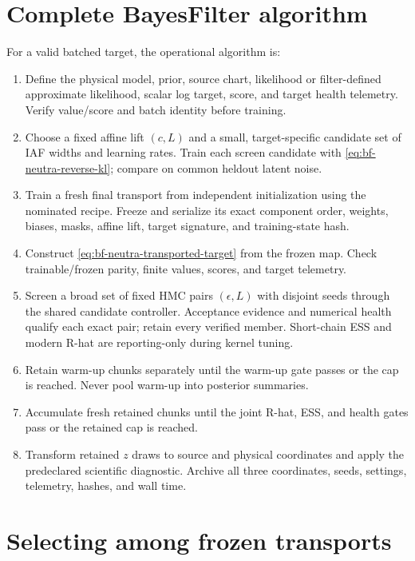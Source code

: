 \section{Complete BayesFilter algorithm}

For a valid batched target, the operational algorithm is:
\begin{enumerate}
 \item Define the physical model, prior, source chart, likelihood or
 filter-defined approximate likelihood, scalar log target, score, and target
 health telemetry.  Verify value/score and batch identity before training.
 \item Choose a fixed affine lift $(c,L)$ and a small, target-specific candidate
 set of IAF widths and learning rates.  Train each screen candidate with
 \eqref{eq:bf-neutra-reverse-kl}; compare on common heldout latent noise.
 \item Train a fresh final transport from independent initialization using the
 nominated recipe.  Freeze and serialize its exact component order, weights,
 biases, masks, affine lift, target signature, and training-state hash.
 \item Construct \eqref{eq:bf-neutra-transported-target} from the frozen map.
 Check trainable/frozen parity, finite values, scores, and target telemetry.
 \item Screen a broad set of fixed HMC pairs $(\epsilon,L)$ with disjoint
 seeds through the shared candidate controller. Acceptance evidence and
 numerical health qualify each exact pair; retain every verified member.
 Short-chain ESS and modern R-hat are reporting-only during kernel tuning.
 \item Retain warm-up chunks separately until the warm-up gate passes or the
 cap is reached.  Never pool warm-up into posterior summaries.
 \item Accumulate fresh retained chunks until the joint R-hat, ESS, and health
 gates pass or the retained cap is reached.
 \item Transform retained $z$ draws to source and physical coordinates and
 apply the predeclared scientific diagnostic.  Archive all three coordinates,
 seeds, settings, telemetry, hashes, and wall time.
\end{enumerate}

\section{Selecting among frozen transports}
\label{sec:bf-neutra-candidate-selection}

